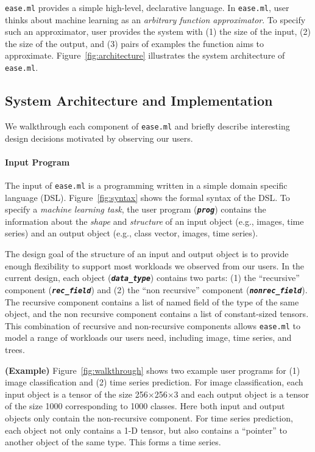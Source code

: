 \documentclass[letterpaper]{vldb}
\newcommand{\eml}{\texttt{ease.ml}\xspace}
\begin{document}
\eml provides a simple high-level, declarative language.
In \eml, user thinks about machine learning as an {\em arbitrary function approximator}.
To specify such an approximator, user provides the
system with (1) the size of the input, (2) the size of the output,
and (3) pairs of examples the function aims to approximate.
Figure~\ref{fig:architecture} illustrates the system architecture of \eml.

\vspace{-0.5em}
\subsection{System Architecture and Implementation}

We walkthrough each component of \eml and briefly
describe interesting design decisions
motivated by observing our users. 

\vspace{-1em}
\paragraph*{Input Program} The input
of \eml is a programming written in 
a simple domain specific language (DSL). Figure~\ref{fig:syntax}
shows the formal syntax of the DSL. To specify
a {\em machine learning task}, the user program (\textbf{\texttt{\em prog}})
contains the information about the {\em shape}
and {\em structure} of an input object (e.g., images, time series)
and an output object (e.g., class vector, images, time series).

The design goal of the structure of an input and output
object is to provide enough flexibility to support most
workloads we observed from our users. In the current design,
each object (\textbf{\texttt{\em data\_type}}) contains two parts:
(1) the ``recursive'' component (\textbf{\texttt{\em rec\_field}})
and (2) the ``non recursive'' component (\textbf{\texttt{\em nonrec\_field}}).
The recursive component contains a list of named 
field of the type of the same object, and the non recursive
component contains a list of constant-sized tensors.
This combination of recursive and non-recursive
components allows \eml to model a range of workloads
our users need, including image, time series, and trees.

\vspace{0.5em}
\noindent
{\bf (Example)} Figure~\ref{fig:walkthrough} shows
two example user programs for (1) image classification and (2) time series
prediction. For image classification, each input
object is a tensor of the size 256$\times$256$\times$3 and
each output object is a tensor of the size 1000 corresponding
to 1000 classes. Here both input
and output objects only contain the non-recursive component.
For time series prediction, each object not only
contains a 1-D tensor, but also contains
a ``pointer'' to another object of the same type. This
forms a time series. 
\end{document}
